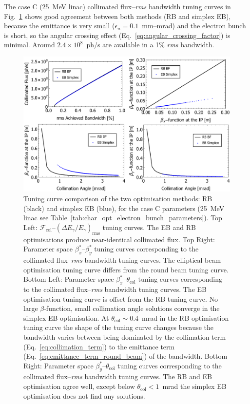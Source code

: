 \documentclass[../main.tex]{subfiles}
\begin{document}
The case C (25~\si{\mega\electronvolt} linac) collimated flux--\textit{rms} bandwidth tuning curves in Fig.~\ref{fig:case_C_optimisation_comparision} shows good agreement between both methods (RB and simplex EB), because the emittance is very small ($\epsilon_{n} = 0.1$~\si{\milli\meter}--\si{\milli\radian}) and the electron bunch is short, so the angular crossing effect (Eq.~\ref{eq:angular_crossing_factor}) is minimal. Around $2.4\times 10^{8}$~ph/\si{\second} are available in a 1\% \textit{rms} bandwidth.
\begin{figure}[!h]
\centering
\includegraphics[width=\textwidth]{Figures/Optimisation_and_Characterisation_of_Inverse_Compton_Scattering_Sources/CaseCoptcomp.pdf}
\caption{Tuning curve comparison of the two optimisation methods: RB (black) and simplex EB (blue), for the case C parameters (25~\si{\mega\electronvolt} linac see Table~\ref{tab:char_opt_electron_bunch_parameters}). Top Left: $\mathcal{F}_{\mathrm{col}}$--$\left(\Delta E_{\gamma}/E_{\gamma}\right)_{\mathrm{rms}}$ tuning curves. The EB and RB optimisations produce near-identical collimated flux. Top Right: Parameter space $\beta_{x}^{*}$--$\beta_{y}^{*}$ tuning curves corresponding to the collimated flux--\textit{rms} bandwidth tuning curves. The elliptical beam optimisation tuning curve differs from the round beam tuning curve. Bottom Left: Parameter space $\beta_{x}^{*}$--$\theta_{\mathrm{col}}$ tuning curves corresponding to the collimated flux--\textit{rms} bandwidth tuning curves. The EB optimisation tuning curve is offset from the RB tuning curve. No large $\beta$-function, small collimation angle solutions converge in the simplex EB optimisation. At $\theta_{\mathrm{col}}\sim 0.4$~\si{\milli\radian} in the RB optimisation tuning curve the shape of the tuning curve changes because the bandwidth varies between being dominated by the collimation term (Eq.~\ref{eq:collimation_term}) to the emittance term (Eq.~\ref{eq:emittance_term_round_beam}) of the bandwidth. Bottom Right: Parameter space $\beta_{y}^{*}$--$\theta_{\mathrm{col}}$ tuning curves corresponding to the collimated flux--\textit{rms} bandwidth tuning curves. The RB and EB optimisation agree well, except below $\theta_{\mathrm{col}} <1$~\si{\milli\radian} the simplex EB optimisation does not find any solutions.}
\label{fig:case_C_optimisation_comparision}
\end{figure}
\end{document}
